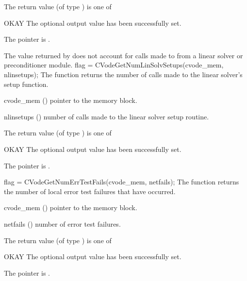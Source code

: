 {
  The return value  (of type ) is one of
  \begin{args}
  \item[OKAY] 
    The optional output value has been successfully set.
  \item[\Id{CVG\_NO\_MEM}]
    The  pointer is .
  \end{args}
}
{
  The  value returned by  does not
  account for calls made to  from a linear solver or preconditioner 
  module. 
}
{
  flag = CVodeGetNumLinSolvSetups(cvode\_mem, nlinsetups);
}
{
  The function  returns the
  number of calls made to the linear solver's setup function.
}
{
  \begin{args}[nlinsetups]
  \item[cvode\_mem] ()
    pointer to the {\cvode} memory block.
  \item[nlinsetups] ()
    number of calls made to the linear solver setup routine.
  \end{args}
}
{
  The return value  (of type ) is one of
  \begin{args}
  \item[OKAY] 
    The optional output value has been successfully set.
  \item[\Id{CVG\_NO\_MEM}]
    The  pointer is .
  \end{args}
}
{}
{
  flag = CVodeGetNumErrTestFails(cvode\_mem, netfails);
}
{
  The function  returns the
  number of local error test failures that have occurred.
}
{
  \begin{args}
  \item[cvode\_mem] ()
    pointer to the {\cvode} memory block.
  \item[netfails] ()
    number of error test failures.
  \end{args}
}
{
  The return value  (of type ) is one of
  \begin{args}
  \item[OKAY] 
    The optional output value has been successfully set.
  \item[\Id{CVG\_NO\_MEM}]
    The  pointer is .
  \end{args}
}
{}
